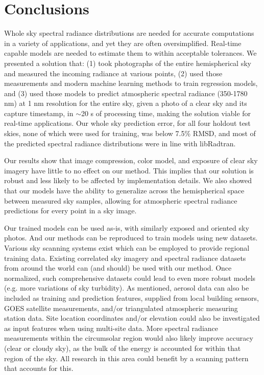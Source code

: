 \section{Conclusions}
\label{sec:conclusion}

Whole sky spectral radiance distributions are needed for accurate computations in a variety of applications, and yet they are often oversimplified. Real-time capable models are needed to estimate them to within acceptable tolerances. We presented a solution that: (1) took photographs of the entire hemispherical sky and measured the incoming radiance at various points, (2) used those measurements and modern machine learning methods to train regression models, and (3) used those models to predict atmospheric spectral radiance (350-1780 nm) at 1 nm resolution for the entire sky, given a photo of a clear sky and its capture timestamp, in $\mathtt{\sim}$20 s of processing time, making the solution viable for real-time applications. Our whole sky prediction error, for all four holdout test skies, none of which were used for training, was below 7.5\% RMSD, and most of the predicted spectral radiance distributions were in line with libRadtran.

Our results show that image compression, color model, and exposure of clear sky imagery have little to no effect on our method. This implies that our solution is robust and less likely to be affected by  implementation details. We also showed that our models have the ability to generalize across the hemispherical space between measured sky samples, allowing for atmospheric spectral radiance predictions for every point in a sky image.

Our trained models can be used as-is, with similarly exposed and oriented sky photos. And our methods can be reproduced to train models using new datasets. Various sky scanning systems exist which can be employed to provide regional training data. Existing correlated sky imagery and spectral radiance datasets from around the world can (and should) be used with our method. Once normalized, such comprehensive datasets could lead to even more robust models (e.g. more variations of sky turbidity). As mentioned, aerosol data can also be included as training and prediction features, supplied from local building sensors, GOES satellite measurements, and/or triangulated atmospheric measuring station data. Site location coordinates and/or elevation could also be investigated as input features when using multi-site data. More spectral radiance measurements within the circumsolar region would also likely improve accuracy (clear or cloudy sky), as the bulk of the energy is accounted for within that region of the sky. All research in this area could benefit by a scanning pattern that accounts for this.

